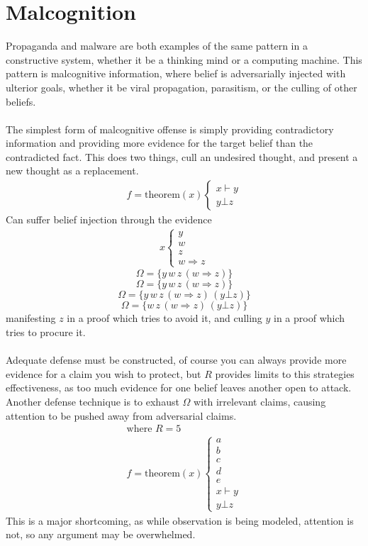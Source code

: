 \documentclass{article}
\begin{document}
	\section{Malcognition}
	Propaganda and malware are both examples of the same pattern in a constructive system, whether it be a thinking mind or a computing machine. This pattern is malcognitive information, where belief is adversarially injected with ulterior goals, whether it be viral propagation, parasitism, or the culling of other beliefs.\\\\
	The simplest form of malcognitive offense is simply providing contradictory information and providing more evidence for the target belief than the contradicted fact. This does two things, cull an undesired thought, and present a new thought as a replacement.
	\begin{align*}
		f = \text{theorem}(x)
		\begin{cases}
		x \vdash y\\
		y \bot z
		\end{cases}
	\end{align*}
	Can suffer belief injection through the evidence
	\begin{align*}
	x
		\begin{cases}
		y\\
		w\\
		z\\
		w \Rightarrow z
		\end{cases}
	\end{align*}
	$$\Omega = \{y\,w\,z\,(w\Rightarrow z)\}$$
	$$\Omega = \{y\,w\,z\,(w\Rightarrow z)\}$$
	$$\Omega = \{y\,w\,z\,(w\Rightarrow z)\,(y\bot z)\}$$
	$$\Omega = \{w\,z\,(w\Rightarrow z)\,(y\bot z)\}$$
	manifesting $z$ in a proof which tries to avoid it, and culling $y$ in a proof which tries to procure it.\\\\
	Adequate defense must be constructed, of course you can always provide more evidence for a claim you wish to protect, but $R$ provides limits to this strategies effectiveness, as too much evidence for one belief leaves another open to attack. Another defense technique is to exhaust $\Omega$ with irrelevant claims, causing attention to be pushed away from adversarial claims.
	\begin{align*}
		\text{where }R=5\\
		f = \text{theorem}(x)
		\begin{cases}
		a\\
		b\\
		c\\
		d\\
		e\\
		x \vdash y\\
		y \bot z
		\end{cases}
	\end{align*}
	This is a major shortcoming, as while observation is being modeled, attention is not, so any argument may be overwhelmed.
\end{document}
